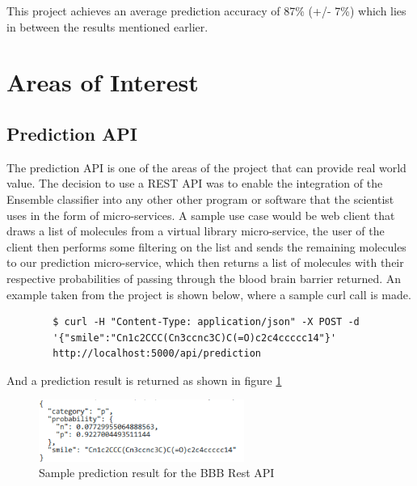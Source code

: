 \documentclass[a4paper,12pt]{article}
\begin{document}
		This project achieves an average prediction accuracy of 87\% (+/- 7\%) which lies in between the results mentioned earlier.
\section{Areas of Interest}
	\subsection{Prediction API}
	The prediction API is one of the areas of the project that can provide real world value. The decision to use a REST API was to enable the integration of the Ensemble classifier into any other other program or software that the scientist uses in the form of micro-services. A sample use case would be web client that draws a list of molecules from a virtual library micro-service, the user of the client then performs some filtering on the list and sends the remaining molecules to our prediction micro-service, which then returns a list of molecules with their respective probabilities of passing through the blood brain barrier returned. An example taken from the project is shown below, where a sample curl call is made.
		\begin{verbatim}
		$ curl -H "Content-Type: application/json" -X POST -d 
		'{"smile":"Cn1c2CCC(Cn3ccnc3C)C(=O)c2c4ccccc14"}'   
		http://localhost:5000/api/prediction
		\end{verbatim}
	And a prediction result is returned as shown in figure \ref{fig:bbb_sample_prediction_result} 
		\begin{figure}[H]
			\centering
			\includegraphics[width=0.6\textwidth,scale=1]{sample_prediction_result}
			\caption{Sample prediction result for the BBB Rest API}
			\label{fig:bbb_sample_prediction_result}
		\end{figure}
\end{document}
